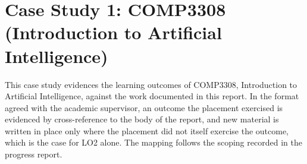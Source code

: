 %
%
%

\section{Case Study 1: COMP3308 (Introduction to Artificial Intelligence)}
\label{app:comp3308}

This case study evidences the learning outcomes of COMP3308, Introduction to
Artificial Intelligence, against the work documented in this report. In the
format agreed with the academic supervisor, an outcome the placement
exercised is evidenced by cross-reference to the body of the report, and new
material is written in place only where the placement did not itself
exercise the outcome, which is the case for LO2 alone. The mapping follows
the scoping recorded in the progress report.

